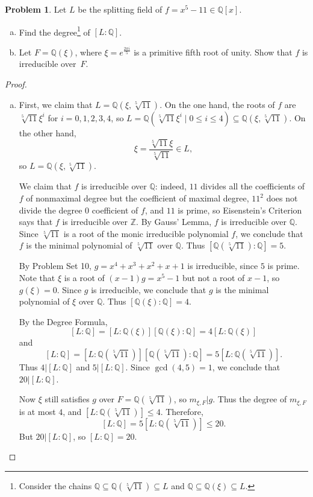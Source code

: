 \documentclass[11pt]{article}
\newcommand{\Q}{\mathbb{Q}}
\newcommand{\Z}{\mathbb{Z}}
\theoremstyle{definition}
\newtheorem{problem}{Problem}
\begin{document}
\begin{problem}
	Let $L$ be the splitting field of $f = x^5 - 11 \in \Q[x]$.
	\begin{enumerate}[(a)]
		\item Find the degree\footnote{Consider the chains $\Q \subseteq \Q(\sqrt[5]{11}) \subseteq L$ and $\Q \subseteq \Q(\xi) \subseteq L$.} of $[L : \Q]$.
		
	
		\item Let $F = \Q(\xi)$, where $\xi = e^{\frac{2 \pi i}{5}}$ is a primitive fifth root of unity. Show that $f$ is irreducible over~$F$.
	

	\end{enumerate}
	
	\begin{proof}$\,$
\begin{enumerate}[a)]
	\item First, we claim that $L = \Q(\xi, \sqrt[5]{11})$. On the one hand, the roots of $f$ are $\sqrt[5]{11} \xi^i$ for $i = 0, 1, 2, 3, 4$, so $L = \Q(\sqrt[5]{11} \xi^i \mid 0 \leqslant i \leqslant 4) \subseteq \Q(\xi, \sqrt[5]{11})$. On the other hand,
	$$\xi = \frac{\sqrt[5]{11} \xi}{\sqrt[5]{11}} \in L,$$
	so $L = \Q(\xi, \sqrt[5]{11})$.
	
	We claim that $f$ is irreducible over $\Q$: indeed, $11$ divides all the coefficients of $f$ of nonmaximal degree but the coefficient of maximal degree, $11^2$ does not divide the degree $0$ coefficient of $f$, and $11$ is prime, so Eisenstein's Criterion says that $f$ is irreducible over $\Z$. By Gauss' Lemma, $f$ is irreducible over $\Q$. Since $\sqrt[5]{11}$ is a root of the monic irreducible polynomial $f$, we conclude that $f$ is the minimal polynomial of $\sqrt[5]{11}$ over $\Q$. Thus $[\Q(\sqrt[5]{11}) : \Q] = 5$.
	
	By Problem Set 10, $g = x^4+x^3+x^2+x+1$ is irreducible, since $5$ is prime. Note that $\xi$ is a root of $(x-1)g = x^5-1$ but not a root of $x-1$, so $g(\xi) = 0$. Since $g$ is irreducible, we conclude that $g$ is the minimal polynomial of $\xi$ over $\Q$. Thus $[\Q(\xi) : \Q] = 4$.
	
	By the Degree Formula,
	$$[L : \Q] = [L : \Q(\xi)] [\Q(\xi) : \Q] = 4[L : \Q(\xi)]$$
	and
	$$[L : \Q] = [L : \Q(\sqrt[5]{11})] [ \Q(\sqrt[5]{11}) : \Q] = 5 [L : \Q(\sqrt[5]{11})].$$
Thus $4 | [L : \Q]$ and $5 | [L : \Q]$. Since $\gcd(4,5) = 1$, we conclude that $20 | [L : \Q]$.

Now $\xi$ still satisfies $g$ over $F = \Q(\sqrt[5]{11})$, so $m_{\xi,F} | g$. Thus the degree of $m_{\xi,F}$ is at most $4$, and $[L : \Q(\sqrt[5]{11})] \leqslant 4$. Therefore,
$$[L : \Q] = 5 [L : \Q(\sqrt[5]{11})] \leqslant 20.$$
But $20 | [L : \Q]$, so $[L : \Q] = 20$.


\end{enumerate}
\end{proof}
\end{problem}
\end{document}
